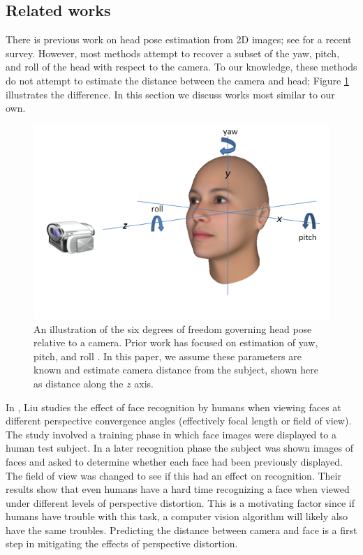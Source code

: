 \documentclass[runningheads]{llncs}
\begin{document}
\subsection{Related works} \label{sec:related}
There is previous work on head pose estimation from 2D images; see \cite{murphy2009head} for a recent survey.
However, most methods attempt to recover a subset of the yaw, pitch, and roll of the head with respect to the camera.
To our knowledge, these methods do not attempt to estimate the distance between the camera and head; Figure \ref{fig:head_pose} illustrates the difference.
In this section we discuss works most similar to our own.

\begin{figure}[ht]
\centering
\includegraphics[width=1.0\linewidth]{resources/figures/head_pose.png}
\caption{
An illustration of the six degrees of freedom governing head pose relative to a camera.
Prior work has focused on estimation of yaw, pitch, and roll \cite{murphy2009head}.
In this paper, we assume these parameters are known and estimate camera distance from the subject, shown here as distance along the $z$ axis.
}
\label{fig:head_pose}
\end{figure}

In \cite{liu2003face,liu2006face}, Liu studies the effect of face recognition by humans when viewing faces at different perspective convergence angles (effectively focal length or field of view). 
The study involved a training phase in which face images were displayed to a human test subject.
In a later recognition phase the subject was shown images of faces and asked to determine whether each face had been previously displayed.
The field of view was changed to see if this had an effect on recognition. 
Their results show that even humans have a hard time recognizing a face when viewed under different levels of perspective distortion.  
This is a motivating factor since if humans have trouble with this task, a computer vision algorithm will likely also have the same troubles.  
Predicting the distance between camera and face is a first step in mitigating the effects of perspective distortion.
\end{document}
